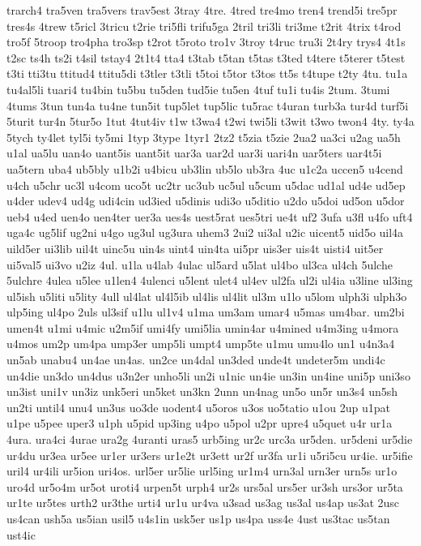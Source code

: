 {trarch4
tra5ven
tra5vers
trav5est
3tray
4tre.
4tred
tre4mo
tren4
trend5i
tre5pr
tres4s
4trew
t5ricl
3tricu
t2rie
tri5fli
trifu5ga
2tril
tri3li
tri3me
t2rit
4trix
t4rod
tro5f
5troop
tro4pha
tro3sp
t2rot
t5roto
tro1v
3troy
t4ruc
tru3i
2t4ry
trys4
4t1s
t2sc
ts4h
ts2i
t4sil
tstay4
2t1t4
tta4
t3tab
t5tan
t5tas
t3ted
t4tere
t5terer
t5test
t3ti
tti3tu
ttitud4
ttitu5di
t3tler
t3tli
t5toi
t5tor
t3tos
tt5s
t4tupe
t2ty
4tu.
tu1a
tu4al5li
tuari4
tu4bin
tu5bu
tu5den
tud5ie
tu5en
4tuf
tu1i
tu4is
2tum.
3tumi
4tums
3tun
tun4a
tu4ne
tun5it
tup5let
tup5lic
tu5rac
t4uran
turb3a
tur4d
turf5i
5turit
tur4n
5tur5o
1tut
4tut4iv
t1w
t3wa4
t2wi
twi5li
t3wit
t3wo
twon4
4ty.
ty4a
5tych
ty4let
tyl5i
ty5mi
1typ
3type
1tyr1
2tz2
t5zia
t5zie
2ua2
ua3ci
u2ag
ua5h
u1al
ua5lu
uan4o
uant5is
uant5it
uar3a
uar2d
uar3i
uari4n
uar5ters
uar4t5i
ua5tern
uba4
ub5bly
u1b2i
u4bicu
ub3lin
ub5lo
ub3ra
4uc
u1c2a
uccen5
u4cend
u4ch
u5chr
uc3l
u4com
uco5t
uc2tr
uc3ub
uc5ul
u5cum
u5dac
ud1al
ud4e
ud5ep
u4der
udev4
ud4g
udi4cin
ud3ied
u5dinis
udi3o
u5ditio
u2do
u5doi
ud5on
u5dor
ueb4
u4ed
uen4o
uen4ter
uer3a
ues4s
uest5rat
ues5tri
ue4t
uf2
3ufa
u3fl
u4fo
uft4
uga4c
ug5lif
ug2ni
u4go
ug3ul
ug3ura
uhem3
2ui2
ui3al
u2ic
uicent5
uid5o
uil4a
uild5er
ui3lib
uil4t
uinc5u
uin4s
uint4
uin4ta
ui5pr
uis3er
uis4t
uisti4
uit5er
ui5val5
ui3vo
u2iz
4ul.
u1la
u4lab
4ulac
ul5ard
u5lat
ul4bo
ul3ca
ul4ch
5ulche
5ulchre
4ulea
u5lee
u1len4
4ulenci
u5lent
ulet4
ul4ev
ul2fa
ul2i
ul4ia
u3line
ul3ing
ul5ish
u5liti
u5lity
4ull
ul4lat
ul4l5ib
ul4lis
ul4lit
ul3m
u1lo
u5lom
ulph3i
ulph3o
ulp5ing
ul4po
2uls
ul3sif
u1lu
ul1v4
u1ma
um3am
umar4
u5mas
um4bar.
um2bi
umen4t
u1mi
u4mic
u2m5if
umi4fy
umi5lia
umin4ar
u4mined
u4m3ing
u4mora
u4mos
um2p
um4pa
ump3er
ump5li
umpt4
ump5te
u1mu
umu4lo
un1
u4n3a4
un5ab
unabu4
un4ae
un4as.
un2ce
un4dal
un3ded
unde4t
undeter5m
undi4c
un4die
un3do
un4dus
u3n2er
unho5li
un2i
u1nic
un4ie
un3in
un4ine
uni5p
uni3so
un3ist
uni1v
un3iz
unk5eri
un5ket
un3kn
2unn
un4nag
un5o
un5r
un3s4
un5sh
un2ti
until4
unu4
un3us
uo3de
uodent4
u5oros
u3os
uo5tatio
u1ou
2up
u1pat
u1pe
u5pee
uper3
u1ph
u5pid
up3ing
u4po
u5pol
u2pr
upre4
u5quet
u4r
ur1a
4ura.
ura4ci
4urae
ura2g
4uranti
uras5
urb5ing
ur2c
urc3a
ur5den.
ur5deni
ur5die
ur4du
ur3ea
ur5ee
ur1er
ur3ers
ur1e2t
ur3ett
ur2f
ur3fa
ur1i
u5ri5cu
ur4ie.
ur5ifie
uril4
ur4ili
ur5ion
uri4os.
url5er
ur5lie
url5ing
ur1m4
urn3al
urn3er
urn5s
ur1o
uro4d
ur5o4m
ur5ot
uroti4
urpen5t
urph4
ur2s
urs5al
urs5er
ur3sh
urs3or
ur5ta
ur1te
ur5tes
urth2
ur3the
urti4
ur1u
ur4va
u3sad
us3ag
us3al
us4ap
us3at
2usc
us4can
ush5a
us5ian
usil5
u4s1in
usk5er
us1p
us4pa
uss4e
4ust
us3tac
us5tan
ust4ic
}
